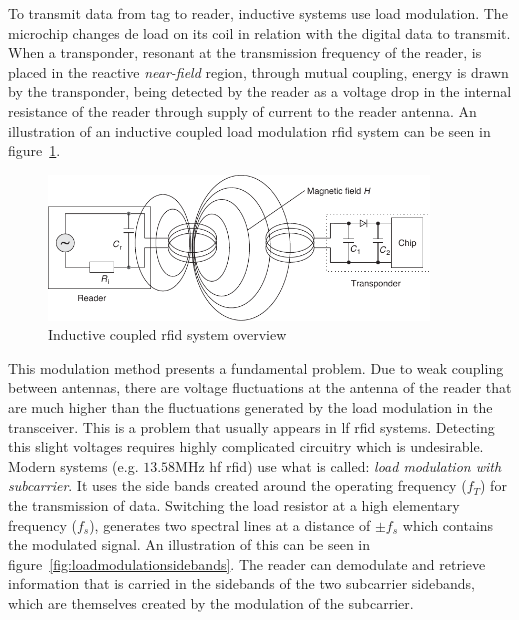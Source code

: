 To transmit data from tag to reader, inductive systems use load modulation. The microchip changes de load on its coil in relation with the digital data to transmit. When a transponder, resonant at the transmission frequency of the reader, is placed in the reactive \emph{near-field} region, through mutual coupling, energy is drawn by the transponder, being detected by the reader as a voltage drop in the internal resistance of the reader through supply of current to the reader antenna.
An illustration of an inductive coupled load modulation \ac{rfid} system can be seen in figure~\ref{fig:loadmodulation}.

\begin{figure}[!ht]
    \centering
    \includegraphics[width=0.9\textwidth]{./figs/02-state-of-the-art/loadmodulation.pdf}
    \caption[Inductive coupled \ac{rfid} system overview]{Inductive coupled \ac{rfid} system overview~\cite{finkenzellerRFIDHandbookFundamentals2003}} 
    \label{fig:loadmodulation}
\end{figure}

This modulation method presents a fundamental problem. Due to weak coupling between antennas, there are voltage fluctuations at the antenna of the reader that are much higher than the fluctuations generated by the load modulation in the transceiver. This is a problem that usually appears in \ac{lf} \ac{rfid} systems. Detecting this slight voltages requires highly complicated circuitry which is undesirable.
Modern systems (e.g. $13.58$MHz \ac{hf} \ac{rfid}) use what is called: \emph{load modulation with subcarrier}. It uses the side bands created around the operating frequency ($f_T$) for the transmission of data. Switching the load resistor at a high elementary frequency ($f_s$), generates two spectral lines at a distance of $\pm f_s$ which contains the modulated signal. An illustration of this can be seen in figure~\ref{fig:loadmodulationsidebands}. The reader can demodulate and retrieve information that is carried in the sidebands of the two subcarrier sidebands, which are themselves created by the modulation of the subcarrier.

